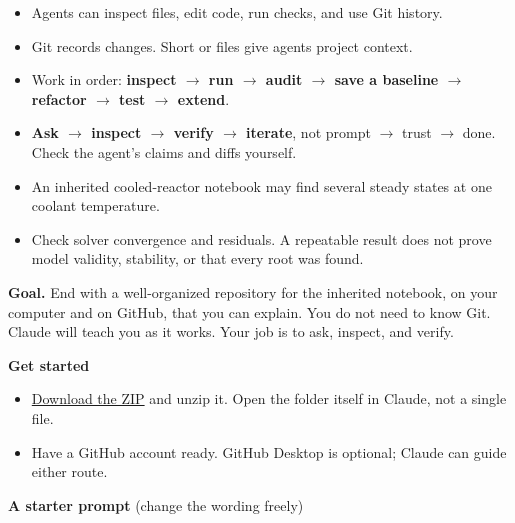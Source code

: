 \begin{itemize}
  \item Agents can inspect files, edit code, run checks, and use Git history.
  \item Git records changes. Short  or  files give agents project context.
  \item Work in order: \textbf{inspect $\rightarrow$ run $\rightarrow$ audit $\rightarrow$ save a baseline $\rightarrow$ refactor $\rightarrow$ test $\rightarrow$ extend}.
  \item \textbf{Ask $\rightarrow$ inspect $\rightarrow$ verify $\rightarrow$ iterate}, not prompt $\rightarrow$ trust $\rightarrow$ done. Check the agent's claims and diffs yourself.
\end{itemize}
\begin{itemize}
  \item An inherited cooled-reactor notebook may find several steady states at one coolant temperature.
  \item Check solver convergence and residuals. A repeatable result does not prove model validity, stability, or that every root was found.
\end{itemize}

\vspace{0.22in}{\color{NDGold}\rule{\linewidth}{0.8pt}}\vspace{-3pt}
\textbf{Goal.} End with a well-organized repository for the inherited notebook, on your computer and on GitHub, that you can explain. You do not need to know Git. Claude will teach you as it works. Your job is to ask, inspect, and verify.

\textbf{Get started}
\begin{itemize}
  \item \href{https://github.com/dowlinglab/claude-for-researchers/releases/latest/download/workshop1_activity.zip}{Download the ZIP} and unzip it. Open the  folder itself in Claude, not a single file.
  \item Have a GitHub account ready. GitHub Desktop is optional; Claude can guide either route.
\end{itemize}

\textbf{A starter prompt} (change the wording freely)

